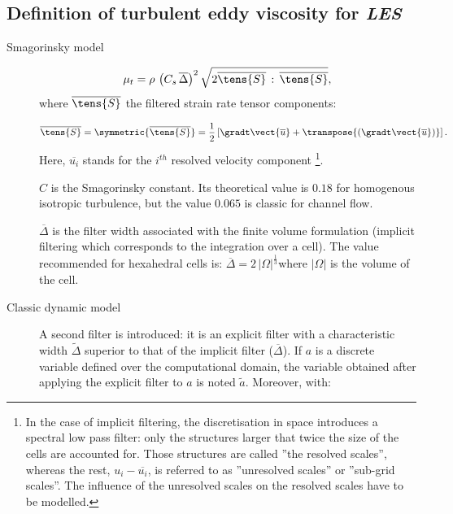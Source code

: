\subsection{Definition of turbulent eddy viscosity for \emph{LES}}

\begin{description}
 \item[Smagorinsky model] 
\begin{equation}
\mu_{t}=\rho \, \left( C_{s}\,\overline{\Delta } \right)^{2}
\sqrt{2\overline{\tens{S}} \,: \, \overline{\tens{S}}},
\end{equation}%
%
where $\overline{\tens{S}}$ the filtered strain rate tensor components:

\begin{equation}
\overline{\tens{S}}= \symmetric{\overline{\tens{S}}} =
\frac{1}{2} \left[ \gradt \vect{\overline{u}} + \transpose{\left( \gradt \vect{\overline{u}} \right)}
\right].
\end{equation}%
%
Here, $\overline{u_{i}}$ stands for the $i^{th}$ resolved velocity component%
\footnote{%
In the case of implicit filtering, the discretisation in space introduces a
spectral low pass filter: only the structures larger that twice the size of
the cells are accounted for. Those structures are called ''the resolved
scales'', whereas the rest, $u_{i}-\overline{u_{i}}$, is referred to as
''unresolved scales'' or ''sub-grid scales''. The influence of the
unresolved scales on the resolved scales have to be modelled.}. 

$C$ is the Smagorinsky constant. Its theoretical value is $0.18$ for
homogenous isotropic turbulence, but the value $0.065$ is classic for
channel flow. 

$\overline{\Delta }$ is the filter width associated with the finite volume
formulation (implicit filtering which corresponds to the integration over a
cell). The value recommended for hexahedral cells is: $\overline{\Delta }%
=2\,|\Omega |^{\frac{1}{3}}$where $|\Omega |$ is the volume of the cell.

\item[Classic dynamic model]
A second filter is introduced: it is an explicit filter with a
characteristic width $\widetilde{\Delta }$ superior to that of the implicit
filter ($\overline{\Delta }$). If $a$ is a discrete variable defined over
the computational domain, the variable obtained after applying the explicit
filter to $a$ is noted $\tilde{a}$. Moreover, with:


\end{description}
